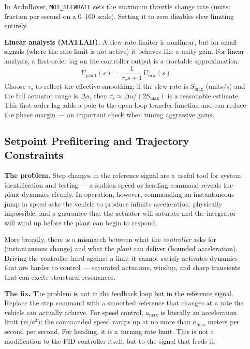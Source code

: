 \documentclass[../../book.tex]{subfiles}
\begin{document}
In ArduRover, \texttt{MOT\_SLEWRATE} sets the maximum throttle change rate
(units: fraction per second on a 0--100 scale).  Setting it to zero disables
slew limiting entirely.

\textbf{Linear analysis (MATLAB).}
A slew rate limiter is nonlinear, but for small signals (where the rate limit
is not active) it behaves like a unity gain.  For linear analysis, a
first-order lag on the controller output is a tractable approximation:
\begin{equation}
  U_\mathrm{plant}(s) = \frac{1}{\tau_s s + 1}\,U_\mathrm{raw}(s)
  \label{eq:slewrate_linear}
\end{equation}
Choose $\tau_s$ to reflect the effective smoothing: if the slew rate is
$S_\mathrm{max}$ (units/s) and the full actuator range is $\Delta u$, then
$\tau_s \approx \Delta u / (2 S_\mathrm{max})$ is a reasonable estimate.
This first-order lag adds a pole to the open-loop transfer function and can
reduce the phase margin --- an important check when tuning aggressive gains.

\subsection{Setpoint Prefiltering and Trajectory Constraints}

\textbf{The problem.}
Step changes in the reference signal are a useful tool for system
identification and testing --- a sudden speed or heading command reveals the
plant dynamics cleanly.  In operation, however, commanding an instantaneous
jump in speed asks the vehicle to produce infinite acceleration: physically
impossible, and a guarantee that the actuator will saturate and the integrator
will wind up before the plant can begin to respond.

More broadly, there is a mismatch between what the \emph{controller} asks for
(instantaneous change) and what the \emph{plant} can deliver (bounded
acceleration).  Driving the controller hard against a limit it cannot
satisfy activates dynamics that are harder to control --- saturated actuators,
windup, and sharp transients that can excite structural resonances.

\textbf{The fix.}
The problem is not in the feedback loop but in the reference signal.  Replace
the step command with a smoothed reference that changes at a rate the vehicle
can actually achieve.  For speed control, $a_\mathrm{max}$ is literally an
acceleration limit (m/s$^2$): the commanded speed ramps up at no more than
$a_\mathrm{max}$ meters per second per second.  For heading, it is a turning
rate limit.  This is not a modification to the PID controller itself, but to
the signal that feeds it.
\end{document}
